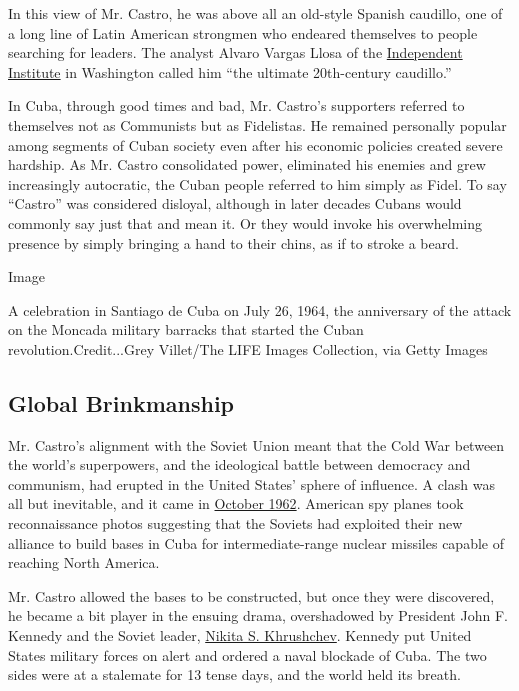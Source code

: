 In this view of Mr. Castro, he was above all an old-style Spanish
caudillo, one of a long line of Latin American strongmen who endeared
themselves to people searching for leaders. The analyst Alvaro Vargas
Llosa of the \href{http://www.independent.org/}{Independent Institute}
in Washington called him ``the ultimate 20th-century caudillo.''

In Cuba, through good times and bad, Mr. Castro's supporters referred to
themselves not as Communists but as Fidelistas. He remained personally
popular among segments of Cuban society even after his economic policies
created severe hardship. As Mr. Castro consolidated power, eliminated
his enemies and grew increasingly autocratic, the Cuban people referred
to him simply as Fidel. To say ``Castro'' was considered disloyal,
although in later decades Cubans would commonly say just that and mean
it. Or they would invoke his overwhelming presence by simply bringing a
hand to their chins, as if to stroke a beard.

Image

A celebration in Santiago de Cuba on July 26, 1964, the anniversary of
the attack on the Moncada military barracks that started the Cuban
revolution.Credit...Grey Villet/The LIFE Images Collection, via Getty
Images

\hypertarget{global-brinkmanship}{%
\subsection{Global Brinkmanship}\label{global-brinkmanship}}

Mr. Castro's alignment with the Soviet Union meant that the Cold War
between the world's superpowers, and the ideological battle between
democracy and communism, had erupted in the United States' sphere of
influence. A clash was all but inevitable, and it came in
\href{http://www.nytimes3xbfgragh.onion/slideshow/2012/10/19/world/americas/cuban-missilecrisis-.html}{October
1962}. American spy planes took reconnaissance photos suggesting that
the Soviets had exploited their new alliance to build bases in Cuba for
intermediate-range nuclear missiles capable of reaching North America.

Mr. Castro allowed the bases to be constructed, but once they were
discovered, he became a bit player in the ensuing drama, overshadowed by
President John F. Kennedy and the Soviet leader,
\href{http://query.nytimes3xbfgragh.onion/gst/abstract.html?res=9C06E0D61E3FE63ABC4A52DFBF66838A669EDE}{Nikita
S. Khrushchev}. Kennedy put United States military forces on alert and
ordered a naval blockade of Cuba. The two sides were at a stalemate for
13 tense days, and the world held its breath.

